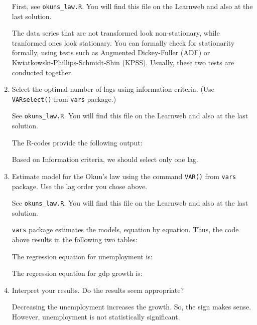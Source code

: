 \begin{enumerate}
          \begin{sol}
              First, see \texttt{okuns\_law.R}. You will find this file on the Learnweb and also at the last solution.

              The data series that are not transformed look non-stationary, while tranformed ones look stationary. You can formally check for stationarity formally, using tests such as Augmented Dickey-Fuller (ADF) or Kwiatkowski-Phillips-Schmidt-Shin (KPSS). Usually, these two tests are conducted together.
          \end{sol}

    \item Select the optimal number of lags using information criteria. (Use \verb|VARselect()| from \verb|vars| package.)

          \begin{sol}
              See \texttt{okuns\_law.R}. You will find this file on the Learnweb and also at the last solution.

              The R-codes provide the following output:
              

              Based on Information criteria, we should select only one lag.
          \end{sol}

    \item Estimate \varp{} model for the Okun's law using the command \verb|VAR()| from \verb|vars| package. Use the lag order you chose above.

          \begin{sol}
              See \texttt{okuns\_law.R}. You will find this file on the Learnweb and also at the last solution.

              \verb|vars| package estimates the \varp{} models, equation by equation. Thus, the code above results in the following two tables:

              The regression equation for unemployment is:
              

              The regression equation for gdp growth is:
              
          \end{sol}

    \item Interpret your results. Do the results seem appropriate?

          \begin{sol}
              Decreasing the unemployment increases the growth. So, the sign makes sense. However, unemployment is not statistically significant.


\end{sol}
\end{enumerate}
